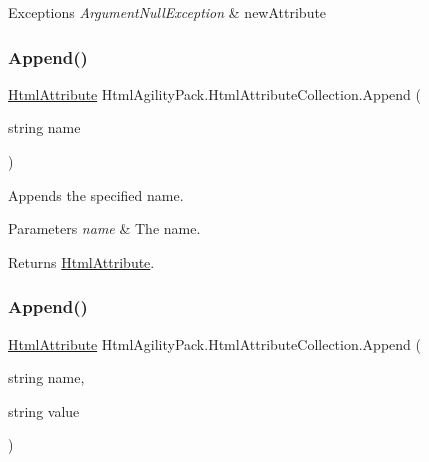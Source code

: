 \begin{DoxyExceptions}{Exceptions}
{\em Argument\+Null\+Exception} & new\+Attribute\\
\hline
\end{DoxyExceptions}
\mbox{\label{class_html_agility_pack_1_1_html_attribute_collection_a390332cec44d3b400546b2683533a9db}} 
\subsubsection{\texorpdfstring{Append()}{Append()}\hspace{0.1cm}{\footnotesize\ttfamily [2/3]}}
{\footnotesize\ttfamily \hyperlink{class_html_agility_pack_1_1_html_attribute}{Html\+Attribute} Html\+Agility\+Pack.\+Html\+Attribute\+Collection.\+Append (\begin{DoxyParamCaption}\item[{string}]{name }\end{DoxyParamCaption})\hspace{0.3cm}{\ttfamily [inline]}}



Appends the specified name. 


\begin{DoxyParams}{Parameters}
{\em name} & The name.\\
\hline
\end{DoxyParams}
\begin{DoxyReturn}{Returns}
\hyperlink{class_html_agility_pack_1_1_html_attribute}{Html\+Attribute}.
\end{DoxyReturn}
\mbox{\label{class_html_agility_pack_1_1_html_attribute_collection_a63cde463956b1a1388ebf1375d939f4d}} 
\subsubsection{\texorpdfstring{Append()}{Append()}\hspace{0.1cm}{\footnotesize\ttfamily [3/3]}}
{\footnotesize\ttfamily \hyperlink{class_html_agility_pack_1_1_html_attribute}{Html\+Attribute} Html\+Agility\+Pack.\+Html\+Attribute\+Collection.\+Append (\begin{DoxyParamCaption}\item[{string}]{name,  }\item[{string}]{value }\end{DoxyParamCaption})\hspace{0.3cm}{\ttfamily [inline]}}



